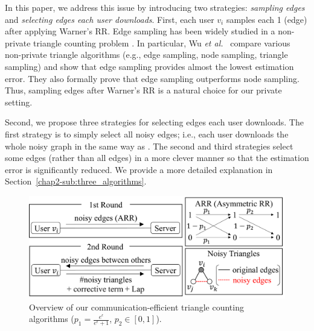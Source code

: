 In this paper, we address this issue by introducing two strategies: \textit{sampling edges} and \textit{selecting edges each user downloads}.
First, each user $v_i$ samples each 1 (edge) after applying Warner's RR.
Edge sampling has been widely studied in a
non-private triangle counting problem \cite{Bera_PODS20,Eden_FOCS15,Tsourakakis_KDD09,Wu_TKDE16}.
In particular, Wu \textit{et al.}~\cite{Wu_TKDE16} compare various non-private triangle algorithms (e.g., edge sampling, node sampling, triangle sampling) and show that edge sampling provides almost the lowest estimation error.
They also formally prove that edge sampling outperforms node sampling.
Thus, sampling edges after Warner's RR is a natural choice for our private setting.

Second, we propose three strategies for selecting edges each user downloads.
The first strategy is to simply select all noisy edges; i.e., each user downloads the whole noisy graph in the same way as \cite{Imola_USENIX21}.
The second and third strategies select some edges (rather than all edges) in a more clever manner so that the estimation error is significantly reduced.
We provide a more detailed explanation in Section~\ref{chap2-sub:three_algorithms}.

\begin{figure}[t]
  \centering
  \includegraphics[width=0.99\linewidth]{fig/algorithm_overview.pdf}
  
  \caption[Overview of communication-efficient triangle counting algorithms.]
	{Overview of our communication-efficient triangle counting algorithms
  ($p_1 =\frac{e^{\epsilon}}{e^{\epsilon}+1}$,
  $p_2 \in [0,1]$).}
  \label{chap2-fig:alg_overview}
\end{figure}

